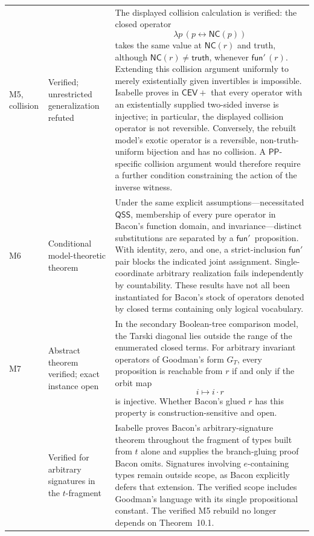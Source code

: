 \documentclass[12pt,leqno]{article}
\newcommand{\IFF}{\ensuremath{\leftrightarrow}}
\theoremstyle{plain}
\theoremstyle{definition}
\newcommand{\funp}{\ensuremath{\mathsf{fun}'\,}}
\newcommand{\PP}{\ensuremath{\mathsf{PP}}}
\newcommand{\QSS}{\ensuremath{\mathsf{QSS}}}
\begin{document}
\begin{longtable}{>{\raggedright\arraybackslash}p{0.55in}
                  >{\raggedright\arraybackslash}p{1.28in}
                  >{\raggedright\arraybackslash}p{4.25in}}
M5, collision & Verified; unrestricted generalization refuted &
The displayed collision calculation is verified: the closed operator
\[
  \lambda p\,(p\IFF\mathsf{NC}(p))
\]
takes the same value at \(\mathsf{NC}(r)\) and truth, although
\(\mathsf{NC}(r)\neq\mathsf{truth}\), whenever \(\funp(r)\).  Extending this
collision argument uniformly to merely existentially given invertibles is
impossible.  Isabelle proves in \(\mathsf{CEV}+\) that every operator with an
existentially supplied two-sided inverse is injective; in particular, the
displayed collision operator is not reversible.  Conversely, the rebuilt
model's exotic operator is a reversible, non-truth-uniform bijection and has
no collision.  A \PP-specific collision argument would therefore require a
further condition constraining the action of the inverse witness.\\

M6 & Conditional model-theoretic theorem &
Under the same explicit assumptions---necessitated \QSS, membership of every
pure operator in Bacon's function domain, and invariance---distinct
substitutions are separated by a \(\funp\) proposition.  With identity,
zero, and one, a strict-inclusion \(\funp\) pair blocks the indicated joint
assignment.  Single-coordinate arbitrary realization fails independently
by countability.  These results have not all been instantiated for Bacon's
stock of operators denoted by closed terms containing only logical
vocabulary.\\

M7 & Abstract theorem verified; exact instance open &
In the secondary Boolean-tree comparison model, the Tarski diagonal lies
outside the range of the enumerated closed terms.
For arbitrary invariant operators of Goodman's form \(G_T\), every proposition is reachable from \(r\)
if and only if the orbit map
\[
 i\longmapsto i\cdot r
\]
is injective.  Whether Bacon's glued \(r\) has this property is
construction-sensitive and open.\\

10.1 & Verified for arbitrary signatures in the \(t\)-fragment &
Isabelle proves Bacon's arbitrary-signature theorem throughout the fragment
of types built from \(t\) alone and supplies the branch-gluing proof Bacon
omits.  Signatures involving \(e\)-containing types remain outside scope, as
Bacon explicitly defers that extension.  The verified scope includes
Goodman's language with its single propositional constant.  The verified M5
rebuild no longer depends on Theorem~10.1.\\
\bottomrule
\end{longtable}
\end{document}
